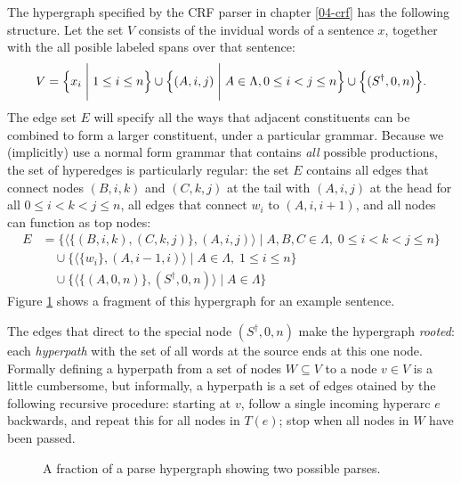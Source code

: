   \begin{example}{}
    The hypergraph specified by the CRF parser in chapter \ref{04-crf} has the following structure. Let the set $V$ consists of the invidual words of a sentence $x$, together with the all posible labeled spans over that sentence:
    \begin{align*}
      V = \Big\{ \x_i \; \Bigg\vert \; 1 \leq i \leq n \Big\} \cup \Big\{ (A, i, j) \; \Bigg\vert \; A \in \Lambda, 0 \leq i < j \leq n \Big\} \cup \Big\{ (S^{\dagger}, 0, n) \Big\}.
    \end{align*}
    The edge set $E$ will specify all the ways that adjacent constituents can be combined to form a larger constituent, under a particular grammar. Because we (implicitly) use a normal form grammar that contains \textit{all} possible productions, the set of hyperedges is particularly regular: the set $E$ contains all edges that connect nodes $(B, i, k)$ and $(C, k, j)$ at the tail with $(A, i, j)$ at the head for all $0 \leq i < k < j \leq n$, all edges that connect $w_i$ to $(A, i, i+1)$, and all nodes can function as top nodes:
    \begin{align*}
      E
        &= \Bigg\{ \Big\langle \Big\{ (B, i, k), (C, k, j) \Big\},  (A, i, j) \Big\rangle \; \Bigg\vert \; A, B, C \in \Lambda, \; 0 \leq i < k < j \leq n \Bigg\}  \\
        &\quad\cup \Bigg\{ \Big\langle \{ w_i \}, (A, i-1, i) \Big\rangle \; \Bigg\vert \; A \in \Lambda, \; 1 \leq i \leq n \Bigg\}  \\
        &\quad\cup \Bigg\{ \Big\langle \{ (A, 0, n) \}, (S^{\dagger}, 0, n) \Big\rangle \; \Bigg\vert \; A \in \Lambda \Bigg\}
    \end{align*}
    Figure \ref{fig:hypergraph} shows a fragment of this hypergraph for an example sentence.

  \end{example}

  The edges that direct to the special node $(S^{\dagger}, 0, n)$ make the hypergraph \textit{rooted}: each \textit{hyperpath} with the set of all words at the source ends at this one node. Formally defining a hyperpath from a set of nodes $W \subseteq V$ to a node $v \in V$ is a little cumbersome, but informally, a hyperpath is a set of edges otained by the following recursive procedure: starting at $v$, follow a single incoming hyperarc $e$ backwards, and repeat this for all nodes in $T(e)$; stop when all nodes in $W$ have been passed.

\begin{figure}[h]
  \center
  \begin{tikzpicture}[scale=.6]
    
  \end{tikzpicture}
  \caption{A fraction of a parse hypergraph showing two possible parses.}
  \label{fig:hypergraph}
\end{figure}


